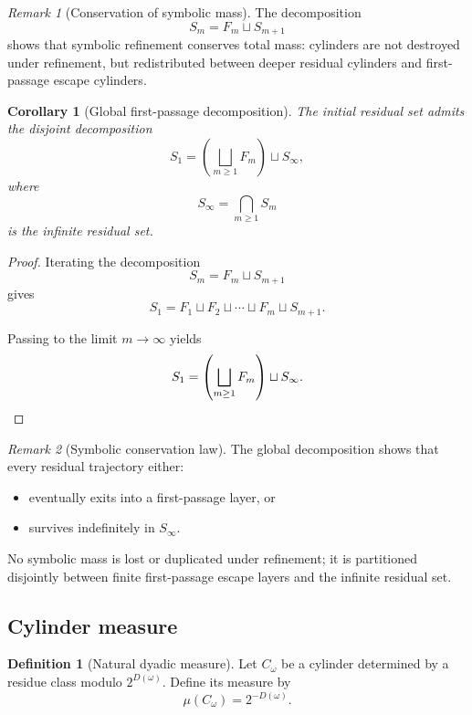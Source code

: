 \documentclass[12pt, oneside]{article}
\numberwithin{equation}{section}
\theoremstyle{definition}
\newtheorem{definition}{Definition}[section]
\theoremstyle{plain}
\newtheorem{corollary}[theorem]{Corollary}
\theoremstyle{remark}
\newtheorem*{remark}{Remark}
\begin{document}
\begin{remark}[Conservation of symbolic mass]
The decomposition
\[
S_m = F_m \sqcup S_{m+1}
\]
shows that symbolic refinement conserves total mass: cylinders are not
destroyed under refinement, but redistributed between deeper residual
cylinders and first-passage escape cylinders.
\end{remark}

\begin{corollary}[Global first-passage decomposition]
\label{cor:global-decomposition}
The initial residual set admits the disjoint decomposition
\[
S_1 = \left(\bigsqcup_{m\ge1} F_m\right) \sqcup S_\infty,
\]
where
\[
S_\infty = \bigcap_{m\ge1} S_m
\]
is the infinite residual set.
\end{corollary}

\begin{proof}
Iterating the decomposition
\[
S_m = F_m \sqcup S_{m+1}
\]
gives
\[
S_1 = F_1 \sqcup F_2 \sqcup \cdots \sqcup F_m \sqcup S_{m+1}.
\]

Passing to the limit \(m\to\infty\) yields
\[
S_1 = \left(\bigsqcup_{m\ge1}F_m\right) \sqcup S_\infty.
\qedhere
\]
\end{proof}

\begin{remark}[Symbolic conservation law]
The global decomposition shows that every residual trajectory
either:
\begin{itemize}
\item eventually exits into a first-passage layer, or
\item survives indefinitely in \(S_\infty\).
\end{itemize}

No symbolic mass is lost or duplicated under refinement; it is
partitioned disjointly between finite first-passage escape layers
and the infinite residual set.
\end{remark}

\subsection{Cylinder measure}

\begin{definition}[Natural dyadic measure]
Let \(C_\omega\) be a cylinder determined by a residue class modulo
\(2^{D(\omega)}\). Define its measure by
\[
\mu(C_\omega) = 2^{-D(\omega)}.
\]
\end{definition}
\end{document}
